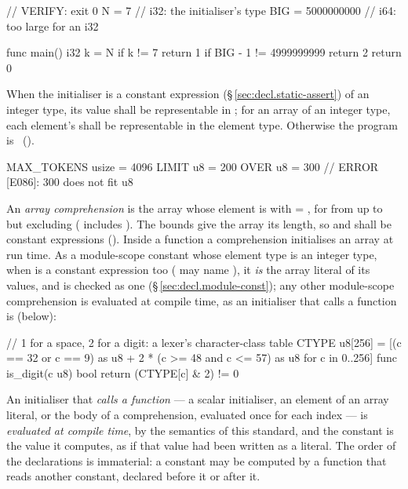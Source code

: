 \begin{laincode}
// VERIFY: exit 0
N = 7                      // i32: the initialiser's type
BIG = 5000000000           // i64: too large for an i32

func main() i32 {
    k = N
    if k != 7 { return 1 }
    if BIG - 1 != 4999999999 { return 2 }
    return 0
}
\end{laincode}

\begin{constraint}
  When the initialiser is a constant expression (\S\,\ref{sec:decl.static-assert}) of an integer
  type, its value shall be representable in ; for an array of an integer type, each
  element's shall be representable in the element type. Otherwise the program is
  \illformed{}~().
\end{constraint}

\begin{laincode}
MAX_TOKENS usize = 4096
LIMIT u8 = 200
OVER u8 = 300            // ERROR [E086]: 300 does not fit u8
\end{laincode}

\pnum
An \emph{array comprehension} \lain{[e for i in lo..hi]} is the array whose element  is
 with  = , for  from  up to but excluding
 ( includes ). The bounds give the array its length, so
 and  shall be constant expressions (). Inside a function a
comprehension initialises an array at run time. As a module-scope constant whose element type
is an integer type, when  is a constant expression too ( may name ), it
\emph{is} the array literal of its values, and is checked as one
(\S\,\ref{sec:decl.module-const}); any other module-scope comprehension is evaluated at compile
time, as an initialiser that calls a function is (below):

\begin{laincode}
// 1 for a space, 2 for a digit: a lexer's character-class table
CTYPE u8[256] = [(c == 32 or c == 9) as u8 + 2 * (c >= 48 and c <= 57) as u8 for c in 0..256]
func is_digit(c u8) bool {
    return (CTYPE[c] & 2) != 0
}
\end{laincode}

\pnum
{}
An initialiser that \emph{calls a function} --- a scalar initialiser, an element of an array
literal, or the body of a comprehension, evaluated once for each index --- is \emph{evaluated at
compile time}, by the semantics of this standard, and the constant is the value it computes, as
if that value had been written as a literal. The order of the declarations is immaterial: a
constant may be computed by a function that reads another constant, declared before it or after
it.

